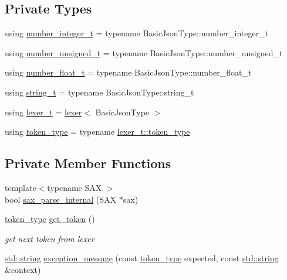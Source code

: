 \subsection*{Private Types}
\begin{DoxyCompactItemize}
\item 
using \mbox{\hyperlink{classnlohmann_1_1detail_1_1parser_aa0362897269e0a7e50ae07be05f42d8e}{number\+\_\+integer\+\_\+t}} = typename Basic\+Json\+Type\+::number\+\_\+integer\+\_\+t
\item 
using \mbox{\hyperlink{classnlohmann_1_1detail_1_1parser_a3773ccef366c61da2e6a8c0eda36d0ec}{number\+\_\+unsigned\+\_\+t}} = typename Basic\+Json\+Type\+::number\+\_\+unsigned\+\_\+t
\item 
using \mbox{\hyperlink{classnlohmann_1_1detail_1_1parser_a8ca8e734da0632c2731fc3b9547dcf28}{number\+\_\+float\+\_\+t}} = typename Basic\+Json\+Type\+::number\+\_\+float\+\_\+t
\item 
using \mbox{\hyperlink{classnlohmann_1_1detail_1_1parser_af67b9b0405262c40be2b13adaab8b046}{string\+\_\+t}} = typename Basic\+Json\+Type\+::string\+\_\+t
\item 
using \mbox{\hyperlink{classnlohmann_1_1detail_1_1parser_a16030c5af158a94d1c799f82ff3a0147}{lexer\+\_\+t}} = \mbox{\hyperlink{classnlohmann_1_1detail_1_1lexer}{lexer}}$<$ Basic\+Json\+Type $>$
\item 
using \mbox{\hyperlink{classnlohmann_1_1detail_1_1parser_a21d247111b332785b7acf3f8e487d117}{token\+\_\+type}} = typename \mbox{\hyperlink{classnlohmann_1_1detail_1_1lexer_a3f313cdbe187cababfc5e06f0b69b098}{lexer\+\_\+t\+::token\+\_\+type}}
\end{DoxyCompactItemize}
\subsection*{Private Member Functions}
\begin{DoxyCompactItemize}
\item 
{\footnotesize template$<$typename S\+AX $>$ }\\bool \mbox{\hyperlink{classnlohmann_1_1detail_1_1parser_ad256ac6f45b213d29096a04b5aa3c587}{sax\+\_\+parse\+\_\+internal}} (S\+AX $\ast$sax)
\item 
\mbox{\hyperlink{classnlohmann_1_1detail_1_1parser_a21d247111b332785b7acf3f8e487d117}{token\+\_\+type}} \mbox{\hyperlink{classnlohmann_1_1detail_1_1parser_a33f3859d0dd402445b5859070fd24bab}{get\+\_\+token}} ()
\begin{DoxyCompactList}\small\item\em get next token from lexer \end{DoxyCompactList}\item 
\mbox{\hyperlink{namespacenlohmann_1_1detail_a1ed8fc6239da25abcaf681d30ace4985ab45cffe084dd3d20d928bee85e7b0f21}{std\+::string}} \mbox{\hyperlink{classnlohmann_1_1detail_1_1parser_a1328166d9e9b655399fdc890d47e4990}{exception\+\_\+message}} (const \mbox{\hyperlink{classnlohmann_1_1detail_1_1parser_a21d247111b332785b7acf3f8e487d117}{token\+\_\+type}} expected, const \mbox{\hyperlink{namespacenlohmann_1_1detail_a1ed8fc6239da25abcaf681d30ace4985ab45cffe084dd3d20d928bee85e7b0f21}{std\+::string}} \&context)
\end{DoxyCompactItemize}
